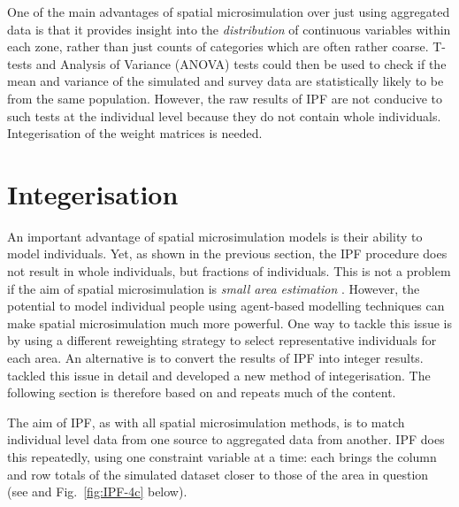 \documentclass[a4paper, 11pt, twoside]{Thesis}
\begin{document}
One of the main advantages 
of spatial microsimulation over just using aggregated data is that it provides
insight into the \emph{distribution} of continuous variables within each zone,
rather than just counts of categories which are often rather coarse. T-tests and
Analysis of Variance (ANOVA) tests could then be used to check if the
mean and variance of the simulated and survey data are statistically likely
to be from the same population. However, the raw results of IPF are not
conducive to such tests at the individual level because they do not contain
whole individuals. Integerisation of the weight matrices is needed.


\section{Integerisation} 
\label{s:integerisation}
An important advantage of spatial microsimulation models is their ability
to model individuals. Yet, as shown in the previous section, the IPF
procedure does not result in whole individuals, but fractions of individuals.
This is not a problem if the aim of spatial microsimulation is \emph{small area
estimation} \citep{Ballas2005b}. However, the potential to model individual
people using agent-based modelling techniques can make spatial microsimulation
much more powerful. One way to tackle this issue is by using a different
reweighting strategy to select representative individuals for each area.
An alternative is to convert the results of IPF into
integer results. \citet{Lovelace2013-trs} tackled this issue in detail and
developed a new method of integerisation. The following section is therefore
based on \citet{Lovelace2013-trs} and repeats much of the content.

The aim of IPF, as with all spatial microsimulation methods, is to  match
individual level data from one source to aggregated data from another.
IPF does this repeatedly, using one constraint variable at a time: each
brings the column and row totals of the simulated dataset closer to
those of the area in question (see \citealp{Ballas2005b} and
Fig.~\ref{fig:IPF-4c} below).
\end{document}
